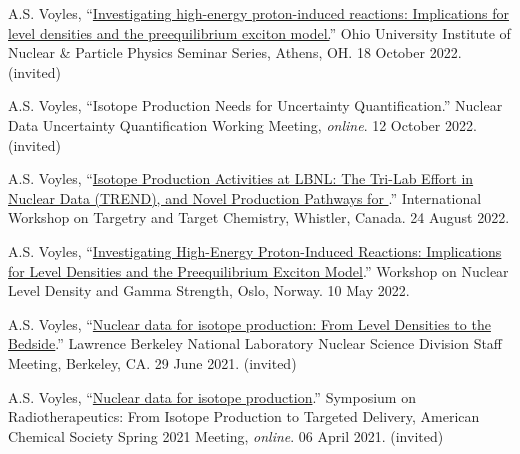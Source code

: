 \begin{bibsection}

\item A.S. Voyles, \enquote{\href{https://inpp.ohio.edu/~inpp/seminars/abstracts_fall2022/INPP_18Oct22.pdf}{Investigating high-energy proton-induced reactions: Implications for level densities and the preequilibrium exciton model.}} Ohio University Institute of Nuclear \& Particle Physics Seminar Series, Athens, OH. 18 October 2022. (invited)

\item A.S. Voyles, \enquote{Isotope Production Needs for Uncertainty Quantification.} Nuclear Data Uncertainty Quantification Working Meeting, \emph{online}. 12 October 2022. (invited)

\item A.S. Voyles, \enquote{\href{https://meetings.triumf.ca/event/108/contributions/3718/}{Isotope Production Activities at LBNL: The Tri-Lab Effort in Nuclear Data (TREND), and Novel Production Pathways for }.}  International Workshop on Targetry and Target Chemistry, Whistler, Canada. 24 August 2022.

\item A.S. Voyles, \enquote{\href{https://www.mn.uio.no/fysikk/english/research/news-and-events/events/conferences/gamma8/program/book_of_abstracts.pdf}{Investigating High-Energy Proton-Induced Reactions: Implications for Level Densities and the Preequilibrium Exciton Model}.}   Workshop on Nuclear Level Density and Gamma Strength, Oslo, Norway. 10 May 2022.

\item A.S. Voyles, \enquote{\href{https://conferences.lbl.gov/event/541/}{Nuclear data for isotope production: From Level Densities to the Bedside}.} Lawrence Berkeley National Laboratory Nuclear Science Division Staff Meeting, Berkeley, CA. 29 June 2021. (invited)



\item A.S. Voyles, \enquote{\href{https://www.morressier.com/o/event/6022c0c2e8bb0500118660c6/article/609136b66e987178c2dc86ae}{Nuclear data for isotope production}.} Symposium on Radiotherapeutics: From Isotope Production to Targeted
Delivery, American Chemical Society Spring 2021 Meeting, \emph{online}. 06 April 2021. (invited)


\end{bibsection}
